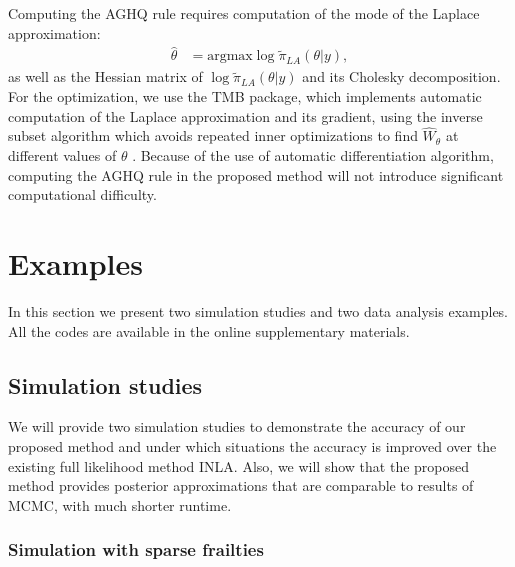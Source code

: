 \documentclass[ba]{imsart}
\begin{document}
Computing the AGHQ rule requires computation of the mode of the Laplace approximation:
\begin{equation}\begin{aligned}
\widehat{\theta} &= \text{argmax}\log\widetilde{\pi}_{LA}(\theta|y),
\end{aligned}\end{equation}
as well as the Hessian matrix of $\log\widetilde{\pi}_{LA}(\theta|y)$ and its Cholesky decomposition. For the optimization, we use the TMB package, which implements automatic computation of the Laplace approximation and its gradient, using the inverse subset algorithm which avoids repeated inner optimizations to find $\widehat{W}_{\theta}$ at different values of $\theta$ \citep{tmb}. Because of the use of automatic differentiation algorithm, computing the AGHQ rule in the proposed method will not introduce significant computational difficulty.



\section{Examples}\label{sec:example}

In this section we present two simulation studies and two data analysis examples. All the codes are available in the online supplementary materials.

\subsection{Simulation studies}\label{subsec:sim}
We will provide two simulation studies to demonstrate the accuracy of our proposed method and under which situations the accuracy is improved over the existing full likelihood method INLA. Also, we will show that the proposed method provides posterior approximations that are comparable to results of MCMC, with much shorter runtime.

\subsubsection{Simulation with sparse frailties}\label{subsubsec:sim1}
\end{document}
